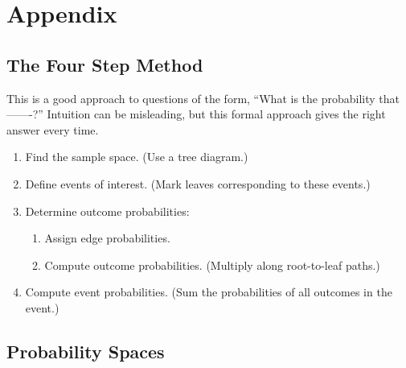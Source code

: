 \documentclass[handout]{mcs}
\begin{document}





\section{Appendix}

\subsection{The Four Step Method}

This is a good approach to questions of the form, ``What is the
probability that -------?''  Intuition can be misleading, but
this formal approach gives the right answer every time.

\begin{enumerate}
\item Find the sample space.  (Use a tree diagram.)

\item Define events of interest.  (Mark leaves corresponding to these
events.)

\item Determine outcome probabilities:

\begin{enumerate}

\item Assign edge probabilities.

\item Compute outcome probabilities.  (Multiply along root-to-leaf
paths.)

\end{enumerate}

\item Compute event probabilities.  (Sum the probabilities of all
outcomes in the event.)

\end{enumerate}

\subsection{Probability Spaces}
\end{document}
